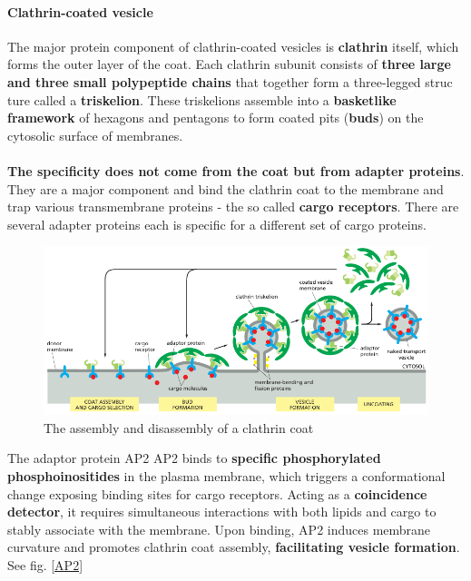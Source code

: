 \documentclass[../main.tex]{subfiles}
\begin{document}
\paragraph{Clathrin-coated vesicle}
\indent The major protein component of clathrin-coated vesicles is \textbf{\gls{clathrin}} itself, which forms the outer layer of the coat. Each clathrin subunit consists of \textbf{three large and three small polypeptide chains} that together form a three-legged struc ture called a \textbf{triskelion}. These triskelions assemble into a \textbf{basketlike framework} of hexagons and pentagons to form coated pits (\textbf{buds}) on the cytosolic surface of membranes. \\
\\
\indent \textbf{The specificity does not come from the coat but from adapter proteins}. They are a major component and bind the clathrin coat to the membrane and trap various transmembrane proteins - the so called \textbf{cargo receptors}. There are several adapter proteins each is specific for a different set of cargo proteins. 

\begin{figure}[H]
	\centering
	\includegraphics[width= \textwidth]{7}
	\caption{The assembly and disassembly of a clathrin coat}
\end{figure}


\begin{ExWithTitle}{The adaptor protein AP2}
	\gls{AP2} binds to \textbf{specific phosphorylated phosphoinositides} in the plasma membrane, which triggers a conformational change exposing binding sites for cargo receptors. Acting as a \textbf{coincidence detector}, it requires simultaneous interactions with both lipids and cargo to stably associate with the membrane. Upon binding, AP2 induces membrane curvature and promotes clathrin coat assembly, \textbf{facilitating vesicle formation}. See fig. \ref{AP2} 
\end{ExWithTitle}
\end{document}
